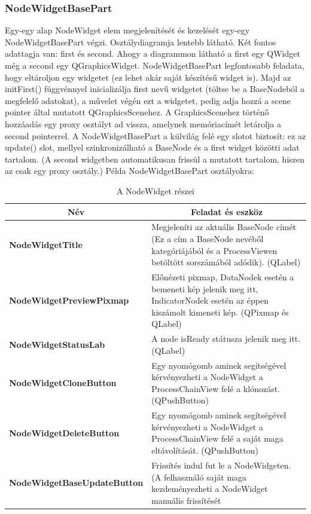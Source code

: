 \documentclass[a4paper,12pt,oneside]{report}
\begin{document}
\subsubsection{NodeWidgetBasePart}
Egy-egy alap NodeWidget elem megjelenítését és kezelését egy-egy NodeWidgetBasePart végzi. Osztálydiagramja lentebb látható. Két fontos adattagja van: first és second. Ahogy a diagrammon látható a first egy QWidget még a second egy QGraphicsWidget. NodeWidgetBasePart legfontosabb feladata, hogy eltároljon egy widgetet (ez lehet akár saját készítésű widget is). Majd az initFirst() függvénnyel inicializálja first nevű widgetet (töltse be a BaseNodeból a megfelelő adatokat), a művelet végén ezt a widgetet, pedig adja hozzá a scene pointer által mutatott QGraphicsScenehez. A GraphicsScenehez történő hozzáadás egy proxy osztályt ad vissza, amelynek memóriacímét letárolja a second pointerrel.
A NodeWidgetBasePart a külvilág felé egy slotot biztosít: ez az update() slot, mellyel szinkronizálható a BaseNode és a first widget közötti adat tartalom. (A second widgetben automatikusan frissül a mutatott tartalom, hiszen az csak egy proxy osztály.)
Példa NodeWidgetBasePart osztályokra:
\begin{table}[h]
\begin{tabular}{p{5.5cm}|p{7.5cm}}

\toprule
\multicolumn{1}{c}{\textbf{Név}} & \multicolumn{1}{c}{\textbf{Feladat és eszköz}} \\ \midrule
\textbf{NodeWidgetTitle} & Megjeleníti az aktuális BaseNode címét (Ez a cím a BaseNode nevéből kategóriájából és a ProcessViewen betöltött sorszámából adódik). (QLabel)\\
\hline
\textbf{NodeWidgetPreviewPixmap} & Előnézeti pixmap, DataNodek esetén a bemeneti kép jelenik meg itt, IndicatorNodek esetén az éppen kiszámolt kimeneti kép. (QPixmap és QLabel) \\
\hline
\textbf{NodeWidgetStatusLab} & A node isReady státusza jelenik meg itt. (QLabel) \\
\hline
\textbf{NodeWidgetCloneButton} & Egy nyomógomb aminek segítségével kérvényezheti a NodeWidget a ProcessChainView felé a klónozást. (QPushButton) \\
\hline
\textbf{NodeWidgetDeleteButton} & Egy nyomógomb aminek segítségével kérvényezheti a NodeWidget a ProcessChainView felé a saját maga eltávolítását. (QPushButton) \\
\hline
\textbf{NodeWidgetBaseUpdateButton} & Frissítés indul fut le a NodeWidgeten. (A felhasználó saját maga kezdeményezheti a NodeWidget manuális frissítését \\ 
\hline

\end{tabular}
\caption{A NodeWidget részei}
\label{table:nodewidgetparts}
\end{table}
\end{document}
